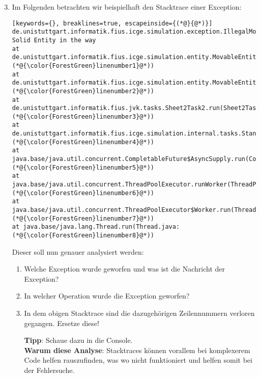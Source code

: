 \begin{enumerate}[label=\alph*)] \setcounter{enumi}{2}
    \item Im Folgenden betrachten wir beispielhaft den Stacktrace einer Exception:
        \begin{lstlisting}[keywords={}, breaklines=true, escapeinside={(*@}{@*)}]
de.unistuttgart.informatik.fius.icge.simulation.exception.IllegalMoveException: Solid Entity in the way
at de.unistuttgart.informatik.fius.icge.simulation.entity.MovableEntity.internalMove(MovableEntity.java:(*@{\color{ForestGreen}linenumber1}@*))
at de.unistuttgart.informatik.fius.icge.simulation.entity.MovableEntity.move(MovableEntity.java:(*@{\color{ForestGreen}linenumber2}@*))
at de.unistuttgart.informatik.fius.jvk.tasks.Sheet2Task2.run(Sheet2Task2.java:(*@{\color{ForestGreen}linenumber3}@*))
at de.unistuttgart.informatik.fius.icge.simulation.internal.tasks.StandardTaskRunner.executeTask(StandardTaskRunner.java:(*@{\color{ForestGreen}linenumber4}@*))
at java.base/java.util.concurrent.CompletableFuture$AsyncSupply.run(CompletableFuture.java:(*@{\color{ForestGreen}linenumber5}@*))
at java.base/java.util.concurrent.ThreadPoolExecutor.runWorker(ThreadPoolExecutor.java:(*@{\color{ForestGreen}linenumber6}@*))
at java.base/java.util.concurrent.ThreadPoolExecutor$Worker.run(ThreadPoolExecutor.java:(*@{\color{ForestGreen}linenumber7}@*))
at java.base/java.lang.Thread.run(Thread.java:(*@{\color{ForestGreen}linenumber8}@*))
        \end{lstlisting}

        Dieser soll nun genauer analysiert werden:

        \begin{enumerate}
            \item[i)] Welche Exception wurde geworfen und was ist die Nachricht der Exception?
            \item[ii)] In welcher Operation wurde die Exception geworfen?
            \item[iii)] In dem obigen Stacktrace sind die dazugehörigen Zeilennummern verloren gegangen. Ersetze diese!

            \textbf{Tipp}: Schaue dazu in die Console.\\
            \textbf{Warum diese Analyse}: Stacktraces können vorallem bei komplexerem Code helfen rauszufinden, was wo nicht funktioniert und helfen somit bei der Fehlersuche.
        \end{enumerate}


\end{enumerate}
